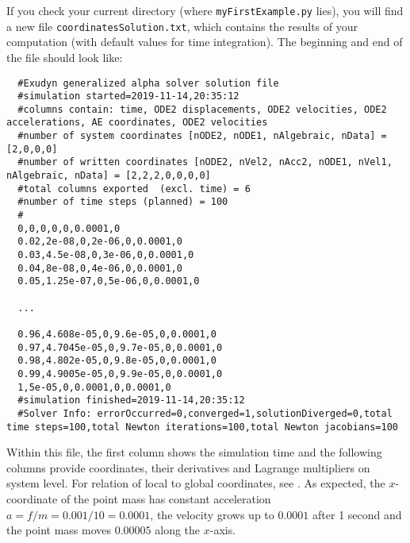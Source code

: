 If you check your current directory (where \texttt{myFirstExample.py} lies), you will find a new file \texttt{coordinatesSolution.txt}, which contains the results of your computation (with default values for time integration).
The beginning and end of the file should look like: \vspace{6pt}\\
\begin{lstlisting}
  #Exudyn generalized alpha solver solution file
  #simulation started=2019-11-14,20:35:12
  #columns contain: time, ODE2 displacements, ODE2 velocities, ODE2 accelerations, AE coordinates, ODE2 velocities
  #number of system coordinates [nODE2, nODE1, nAlgebraic, nData] = [2,0,0,0]
  #number of written coordinates [nODE2, nVel2, nAcc2, nODE1, nVel1, nAlgebraic, nData] = [2,2,2,0,0,0,0]
  #total columns exported  (excl. time) = 6
  #number of time steps (planned) = 100
  #
  0,0,0,0,0,0.0001,0
  0.02,2e-08,0,2e-06,0,0.0001,0
  0.03,4.5e-08,0,3e-06,0,0.0001,0
  0.04,8e-08,0,4e-06,0,0.0001,0
  0.05,1.25e-07,0,5e-06,0,0.0001,0

  ...

  0.96,4.608e-05,0,9.6e-05,0,0.0001,0
  0.97,4.7045e-05,0,9.7e-05,0,0.0001,0
  0.98,4.802e-05,0,9.8e-05,0,0.0001,0
  0.99,4.9005e-05,0,9.9e-05,0,0.0001,0
  1,5e-05,0,0.0001,0,0.0001,0
  #simulation finished=2019-11-14,20:35:12
  #Solver Info: errorOccurred=0,converged=1,solutionDiverged=0,total time steps=100,total Newton iterations=100,total Newton jacobians=100
\end{lstlisting}
%
Within this file, the first column shows the simulation time and the following columns provide coordinates, their derivatives and Lagrange multipliers on system level. For relation of local to global coordinates, see . As expected, the $x$-coordinate of the point mass has constant acceleration $a=f/m=0.001/10=0.0001$, the velocity grows up to $0.0001$ after 1 second and the point mass moves $0.00005$ along the $x$-axis.
%
\newpage
{}

